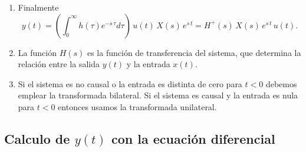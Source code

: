 \begin{enumerate}
\item Finalmente
\begin{equation}
  y(t) =
  \left(\int_{0}^{\infty }h\left(\tau\right) e^{- s \, \tau} d\tau\right) \, u(t) \, X(s) \, e^{s \, t}= 
  H^{+}(s) \, X(s) \, e^{s \, t} \, u(t).
  \label{laplaceunilateral}
\end{equation}

\item La función $H(s)$ es la función de transferencia del sistema, que determina
la relación entre la salida $y(t)$ y la entrada $x(t)$.

\item Si el sistema es no causal o la entrada es distinta de cero
  para $t < 0$ debemos emplear la transformada bilateral. Si el
  sistema es causal y la entrada es nula para $t < 0$ entonces usamos
  la transformada unilateral.

\end{enumerate}

\subsection{Calculo de $y(t)$ con la ecuación diferencial}

